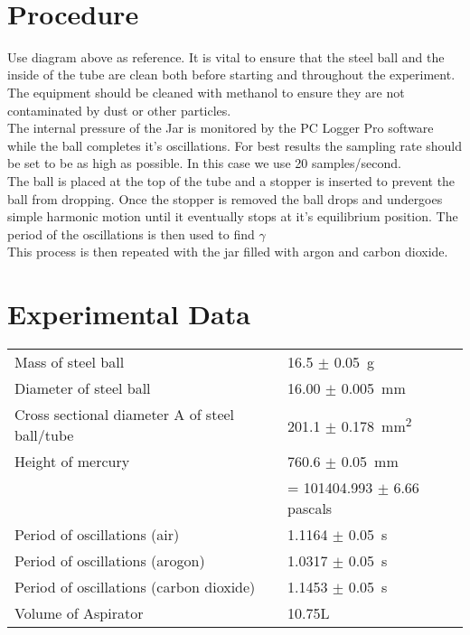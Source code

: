 \documentclass{article}
\begin{document}
\ 

\ 

\ 

\ 

\ 

\ 

\ 

\ 

\ 

\ 

\ 

\ 

\ 

\section{Procedure}
Use diagram above as reference. It is vital to ensure that the steel ball and the inside of the tube are clean both before starting and throughout the experiment. The equipment should be cleaned with methanol to ensure they are not contaminated by dust or other particles.\\ 
The internal pressure of the Jar is monitored by the PC Logger Pro software while the ball completes it's oscillations. For best results the sampling rate should be set to be as high as possible. In this case we use 20 samples/second.\\
The ball is placed at the top of the tube and a stopper is inserted to prevent the ball from dropping. Once the stopper is removed the ball drops and undergoes simple harmonic motion until it eventually stops at it's equilibrium position. The period of the oscillations is then used to find $\gamma$\\
This process is then repeated with the jar filled with argon and carbon dioxide.

\section{Experimental Data}

\begin{tabular}{ll}
Mass of steel ball & 16.5 $\pm$  \SI{0.05}{\gram}\\
Diameter of steel ball & 16.00 $\pm$ \SI{0.005}{\mm}\\
Cross sectional diameter A of steel ball/tube & 201.1 $\pm$ \SI{0.178}{\mm^2}\\
Height of mercury & 760.6 $\pm$ \SI{0.05}{\mm}\\
& =  101404.993 $\pm$ 6.66 pascals\\
Period of oscillations (air) & 1.1164 $\pm$ \SI{0.05}{\s}\\
Period of oscillations (arogon) & 1.0317 $\pm$ \SI{0.05}{\s}\\
Period of oscillations (carbon dioxide) & 1.1453 $\pm$ \SI{0.05}{\s}\\
Volume of Aspirator & 10.75L\\
\end{tabular}
\end{document}
